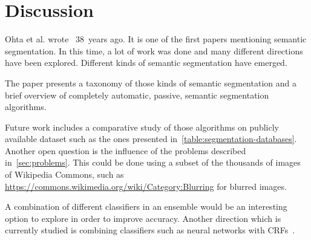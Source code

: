 
\section{Discussion}%
\label{sec:discussion}
Ohta et al. wrote~\cite{ohta1978analysis} 38~years ago. It is one of the first
papers mentioning semantic segmentation. In this time, a lot of work was done
and many different directions have been explored. Different kinds of semantic
segmentation have emerged.

The paper presents a taxonomy of those kinds of semantic segmentation and a
brief overview of completely automatic, passive, semantic segmentation
algorithms.

Future work includes a comparative study of those algorithms on publicly
available dataset such as the ones presented
in~\cref{table:segmentation-databases}. Another open question is the influence
of the problems described in~\cref{sec:problems}. This could be done using a
subset of the thousands of images of Wikipedia Commons, such as \href{https://commons.wikimedia.org/wiki/Category:Blurring}{https://commons.wikimedia.org/wiki/Category:Blurring} for blurred images.

A combination of different classifiers in an ensemble would be an interesting
option to explore in order to improve accuracy. Another direction which is
currently studied is combining classifiers such as neural networks with
\glspl{CRF}~\cite{zheng2015conditional}.
